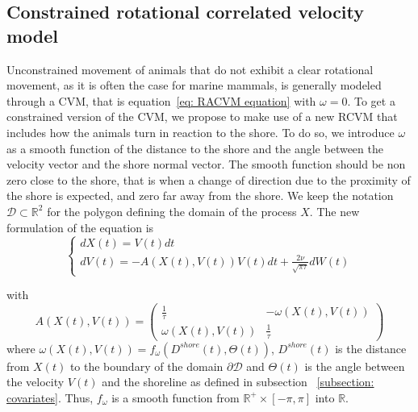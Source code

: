\documentclass[11pt]{article}
\newcommand {\R}{\mathbb{R}}
\newcommand {\1}{\mathbb{1}}
\theoremstyle{definition}
\theoremstyle{remark}
\theoremstyle{remark}
\begin{document}
\subsection{Constrained rotational correlated velocity model}
\label{section: CRCVM}


Unconstrained movement of animals that do not exhibit a clear rotational movement, as it is often the case for marine mammals, is generally modeled through a CVM, that is equation~\ref{eq: RACVM equation} with $\omega=0$.
To get a constrained version of the CVM, we propose to make use of a new RCVM that includes how the animals turn in reaction to the shore. To do so, we introduce $\omega$ as a smooth function of the distance to the shore and the angle between the velocity vector and the shore normal vector. 
The smooth function should be non zero close to the shore, that is when a change of direction due to the proximity of the shore is expected, and  zero far away from the shore. 
We keep the notation $\mathcal{D} \subset \R^2$ for the polygon defining the domain of the process $X$. The new formulation of the equation is 
\begin{equation} \left\{
	\begin{array}{l}
		dX(t)=V(t) dt \\
		dV(t)=-A(X(t),V(t))V(t)dt+\frac{2\nu}{\sqrt{\pi \tau}} dW(t) 
		
	\end{array}
	\right.
	\label{eq: CRCVM equation}
\end{equation}

with 
\begin{equation} 
		A(X(t),V(t))=\begin{pmatrix} 
			\frac{1}{\tau} & -\omega(X(t),V(t)) \\
			\omega(X(t),V(t)) & \frac{1}{\tau}
		\end{pmatrix}
	\label{eq: CRCVM matrix A}
\end{equation}
where $\omega(X(t),V(t))=f_{\omega}(D^{shore}(t),\Theta(t))$, $D^{shore}(t)$ is the distance from $X(t)$ to the boundary of the domain $\partial \mathcal{D}$
and $\Theta(t)$ is the angle between the velocity $V(t)$ and the shoreline as defined in subsection ~\ref{subsection: covariates}. Thus, $f_{\omega}$ is a smooth function from $\R^{+} \times [-\pi,\pi]$ into $\R$.
\end{document}
